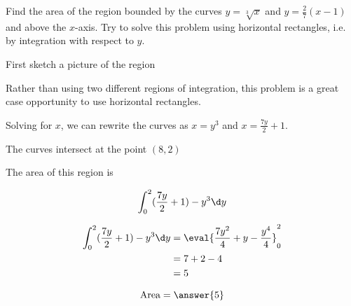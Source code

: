 \documentclass[handout]{ximera}
\begin{document}
\begin{exercise}
Find the area of the region bounded by the curves $y=\sqrt[3]{x}$ and $y=\frac{2}{7}(x-1)$ and above the $x$-axis.  Try to solve this problem using horizontal rectangles, i.e. by integration with respect to $y$.

\begin{hint}

	First sketch a picture of the region

\begin{image}
\end{image}
\end{hint}

\begin{hint}
Rather than using two different regions of integration, this problem is a great case opportunity to use horizontal rectangles.

Solving for $x$, we can rewrite the curves as $x = y^3$ and $x = \frac{7y}{2}+1$.

The curves intersect at the point $(8,2)$
\end{hint}

\begin{hint}
	The area of this region is

	\[
	\int_{0}^{2} ( \frac{7y}{2}+1)-y^3 \d y
	\]
\end{hint}

\begin{hint}


	\begin{align*}
		\int_{0}^{2} ( \frac{7y}{2}+1)-y^3 \d y &=  \eval{\frac{7y^2}{4}+y-\frac{y^4}{4}}_0^2\\
		&= 7+2-4\\
		&= 5
	\end{align*}

	
\end{hint}

	\[
		\textrm{Area} = \answer{5}
	\]

\end{exercise}
\end{document}
